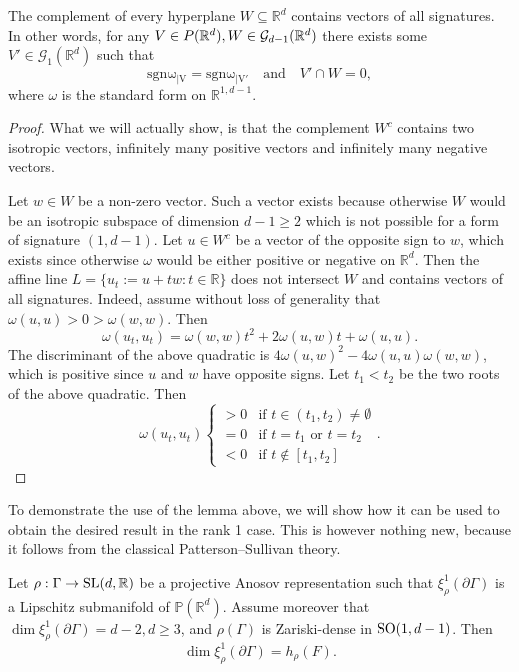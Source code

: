 \documentclass{report}
\begin{document}
\begin{lemma}\label{lem:transverse_subspace}
    The complement of every hyperplane $W \subseteq \mathbb R^d$ contains vectors of all signatures.
    In other words, for any $V \in \mathcal \mathbb P(\mathbb R^d), W \in \mathcal G_{d-1}(\mathbb R^d)$ there exists some $V' \in \mathcal G_1(\mathbb R^d)$ such that
    \[
    \mathrm{sgn \omega_{|V}} = \mathrm{sgn \omega_{|V'}} \quad \text{and} \quad V' \cap W = 0,
    \]
    where $\omega$ is the standard form on $\mathbb R^{1,d-1}$.    
\end{lemma}
\begin{proof}
    What we will actually show, is that the complement $W^c$ contains two isotropic vectors, infinitely many positive vectors and infinitely many negative vectors.

    Let $w \in W$ be a non-zero vector.
    Such a vector exists because otherwise $W$ would be an isotropic subspace of dimension $d-1 \geq 2$ which is not possible for a form of signature $(1, d-1)$.
    Let $u \in W^c$ be a vector of the opposite sign to $w$, which exists since otherwise $\omega$ would be either positive or negative on $\mathbb R^d$.
    Then the affine line $L = \{ u_t := u + tw : t \in \mathbb R \}$ does not intersect $W$ and contains vectors of all signatures.
    Indeed, assume without loss of generality that $\omega(u,u) > 0 > \omega(w,w)$.
    Then
    \[
    \omega(u_t, u_t) = \omega(w,w) t^2 + 2\omega(u, w) t + \omega(u,u).
    \]
    The discriminant of the above quadratic is $4\omega(u,w)^2 - 4\omega(u,u)\omega(w,w)$, which is positive since $u$ and $w$ have opposite signs.
    Let $t_1 < t_2$ be the two roots of the above quadratic.
    Then
    \begin{equation}\label{eq:affine_line}
    \omega(u_t, u_t)
    \begin{cases}
        > 0 & \text{if } t \in (t_1, t_2) \neq \emptyset \\
        = 0 & \text{if } t = t_1 \text{ or } t = t_2 \\
        < 0 & \text{if } t \notin [t_1, t_2]
    \end{cases}.    
    \end{equation}
\end{proof}
To demonstrate the use of the lemma above, we will show how it can be used to obtain the desired result in the rank 1 case.
This is however nothing new, because it follows from the classical Patterson--Sullivan theory.
\begin{lemma}\label{lem:SO_1_d-1}
    Let $\rho: \Gamma \to \operatorname{{\mathrm{SL}}}(d, \mathbb R)$ be a projective Anosov representation such that $\xi^1_\rho(\partial \Gamma)$ is a Lipschitz submanifold of $\mathbb P(\mathbb R^d)$.
    Assume moreover that $\dim \xi_\rho^1(\partial \Gamma) = d - 2, d \geq 3$, and $\rho(\Gamma)$ is Zariski-dense in $\operatorname{{\mathrm{SO}}}(1,d-1)$. Then
    \[
        \dim \xi_\rho^1(\partial \Gamma) = h_\rho(F).
    \]
\end{lemma}
\end{document}
